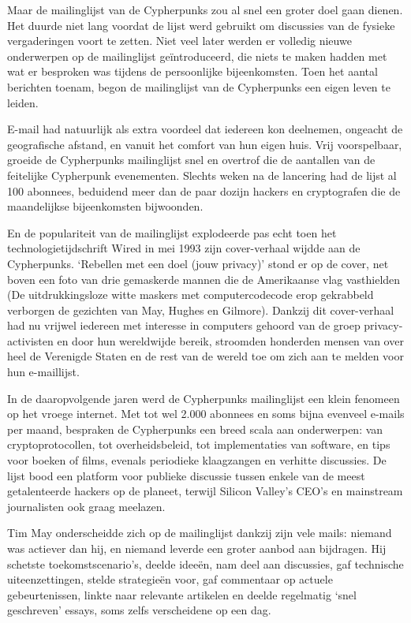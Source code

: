 \documentclass[
  a5paper,
  smalldemyvopaper,11pt,twoside,onecolumn,openright,extrafontsizes]{memoir}
\begin{document}
Maar de mailinglijst van de Cypherpunks zou al snel een groter doel gaan
dienen. Het duurde niet lang voordat de lijst werd gebruikt om
discussies van de fysieke vergaderingen voort te zetten. Niet veel later
werden er volledig nieuwe onderwerpen op de mailinglijst geïntroduceerd,
die niets te maken hadden met wat er besproken was tijdens de
persoonlijke bijeenkomsten. Toen het aantal berichten toenam, begon de
mailinglijst van de Cypherpunks een eigen leven te leiden.

E-mail had natuurlijk als extra voordeel dat iedereen kon deelnemen,
ongeacht de geografische afstand, en vanuit het comfort van hun eigen
huis. Vrij voorspelbaar, groeide de Cypherpunks mailinglijst snel en
overtrof die de aantallen van de feitelijke Cypherpunk evenementen.
Slechts weken na de lancering had de lijst al 100 abonnees, beduidend
meer dan de paar dozijn hackers en cryptografen die de maandelijkse
bijeenkomsten bijwoonden.

En de populariteit van de mailinglijst explodeerde pas echt toen het
technologietijdschrift Wired in mei 1993 zijn cover-verhaal wijdde aan
de Cypherpunks. `Rebellen met een doel (jouw privacy)' stond er op de
cover, net boven een foto van drie gemaskerde mannen die de Amerikaanse
vlag vasthielden (De uitdrukkingsloze witte maskers met computercodecode
erop gekrabbeld verborgen de gezichten van May, Hughes en Gilmore).
Dankzij dit cover-verhaal had nu vrijwel iedereen met interesse in
computers gehoord van de groep privacy-activisten en door hun
wereldwijde bereik, stroomden honderden mensen van over heel de
Verenigde Staten en de rest van de wereld toe om zich aan te melden voor
hun e-maillijst.

In de daaropvolgende jaren werd de Cypherpunks mailinglijst een klein
fenomeen op het vroege internet. Met tot wel 2.000 abonnees en soms
bijna evenveel e-mails per maand, bespraken de Cypherpunks een breed
scala aan onderwerpen: van cryptoprotocollen, tot overheidsbeleid, tot
implementaties van software, en tips voor boeken of films, evenals
periodieke klaagzangen en verhitte discussies. De lijst bood een
platform voor publieke discussie tussen enkele van de meest
getalenteerde hackers op de planeet, terwijl Silicon Valley's CEO's en
mainstream journalisten ook graag meelazen.

Tim May onderscheidde zich op de mailinglijst dankzij zijn vele mails:
niemand was actiever dan hij, en niemand leverde een groter aanbod aan
bijdragen. Hij schetste toekomstscenario's, deelde ideeën, nam deel aan
discussies, gaf technische uiteenzettingen, stelde strategieën voor, gaf
commentaar op actuele gebeurtenissen, linkte naar relevante artikelen en
deelde regelmatig `snel geschreven' essays, soms zelfs verscheidene op
een dag.
\end{document}
